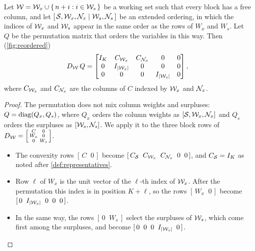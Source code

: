 \begin{theorem} \label{thm:reordering}
Let $\mathcal{W} = \mathcal{W}_x\cup\{\,n+i : i\in\mathcal{W}_s\,\}$ be a working set such that every block has a free
column, and let $[\,\mathcal{S},\mathcal{W}_x,\mathcal{N}_x\mid\mathcal{W}_s,\mathcal{N}_s\,]$ be an extended ordering, in which the indices of
$\mathcal{W}_x$ and $\mathcal{W}_s$ appear in the same order as the rows of $W_x$ and $W_s$. Let $Q$ be the
permutation matrix that orders the variables in this way. Then (\cref{fig:reordered})
\begin{equation} \label{eq:reordered}
D_{\mathcal{W}}\,Q =
\begin{bmatrix}
I_K & C_{\mathcal{W}_x} & C_{\mathcal{N}_x} & 0 & 0\\
0 & I_{|\mathcal{W}_x|} & 0 & 0 & 0\\
0 & 0 & 0 & I_{|\mathcal{W}_s|} & 0
\end{bmatrix},
\end{equation}
where $C_{\mathcal{W}_x}$ and $C_{\mathcal{N}_x}$ are the columns of $C$ indexed by $\mathcal{W}_x$ and $\mathcal{N}_x$.
\end{theorem}

\begin{proof}
The permutation does not mix column weights and surpluses: $Q = \operatorname{diag}(Q_x, Q_s)$, where $Q_x$
orders the column weights as $[\mathcal{S},\mathcal{W}_x,\mathcal{N}_x]$ and $Q_s$ orders the surpluses as
$[\mathcal{W}_s,\mathcal{N}_s]$. We apply it to the three block rows of
$D_{\mathcal{W}} = \left[\begin{smallmatrix} C & 0\\ W_x & 0\\ 0 & W_s\end{smallmatrix}\right]$.
\begin{itemize}
    \item The convexity rows $[\,C\;\;0\,]$ become $[\,C_{\mathcal{S}}\;\;C_{\mathcal{W}_x}\;\;C_{\mathcal{N}_x}\;\;0\;\;0\,]$,
          and $C_{\mathcal{S}} = I_K$ as noted after \cref{def:representatives}.
    \item Row $\ell$ of $W_x$ is the unit vector of the $\ell$-th index of $\mathcal{W}_x$. After the
          permutation this index is in position $K + \ell$, so the rows $[\,W_x\;\;0\,]$ become
          $[\,0\;\;I_{|\mathcal{W}_x|}\;\;0\;\;0\;\;0\,]$.
    \item In the same way, the rows $[\,0\;\;W_s\,]$ select the surpluses of $\mathcal{W}_s$, which come
          first among the surpluses, and become $[\,0\;\;0\;\;0\;\;I_{|\mathcal{W}_s|}\;\;0\,]$. \qedhere
\end{itemize}
\end{proof}

